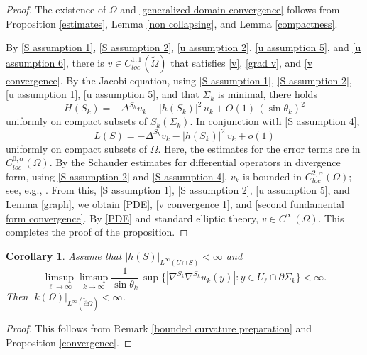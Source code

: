 \documentclass[11pt]{amsart}
\newtheorem{coro}[prop]{Corollary}
\begin{document}
\begin{proof}
The existence of $\Omega$ and \eqref{generalized domain convergence} follows from Proposition \ref{estimates}, Lemma \ref{non collapsing}, and Lemma \ref{compactness}.

 By \eqref{S assumption 1}, \eqref{S assumption 2}, \eqref{u assumption 2},  \eqref{u assumption 5}, and \eqref{u assumption 6},   there is $ v\in C_{loc}^{1,1}(\tilde \Omega)$ that satisfies \eqref{v}, \eqref{grad v}, and \eqref{v convergence}. By the Jacobi equation, using \eqref{S assumption 1}, \eqref{S assumption 2}, \eqref{u assumption 1},   \eqref{u assumption 5}, and that $\Sigma_k$ is minimal, there holds 
$$
H(S_k)=-\Delta^{S_k}u_k-|h(S_k)|^2\,u_k+O(1)\,(\sin\theta_k)^2
$$  
uniformly on compact subsets of $S_k(\Sigma_k)$. 
In conjunction with \eqref{S assumption 4},
$$
L(S)=-\Delta^{S_k}v_k-|h(S_k)|^2\,v_k+o(1)
$$  
uniformly on compact subsets of $\Omega$. Here, the estimates for the error terms are in $C^{0,\alpha}_{loc}(\Omega)$.  By the Schauder estimates for differential operators in divergence form, using \eqref{S assumption 2} and \eqref{S assumption 4}, $v_k$ is bounded in $C_{loc}^{2,\alpha}(\Omega)$; see, e.g., \cite[Theorem 3.1 and Theorem 3.13]{HanLin}. From this, \eqref{S assumption 1}, \eqref{S assumption 2},   \eqref{u assumption 5}, and Lemma \ref{graph},  
we obtain \eqref{PDE}, \eqref{v convergence 1},   and \eqref{second fundamental form convergence}. By \eqref{PDE} and standard elliptic theory,  $v\in C^\infty(\Omega)$. This completes the proof of the proposition.
\end{proof}
\begin{coro} \label{bounded geometry}
	Assume that $|h(S)|_{L^\infty(U\cap S)}<\infty$ and 
	$$
\limsup_{\ell\to\infty}	\limsup_{k\to\infty}\frac{1}{	\sin\theta_k}\,\operatorname{sup}\{|\nabla^{S_k}\nabla^{S_k}u_k(y)|:y\in U_{\ell}\cap \partial \Sigma_k\}<\infty.
	$$
	Then $|k(\Omega)|_{L^\infty(\tilde \partial \Omega)}<\infty$. 
\end{coro}
\begin{proof}
	This follows from Remark \ref{bounded curvature preparation} and Proposition \ref{convergence}. 
\end{proof}
\end{document}
